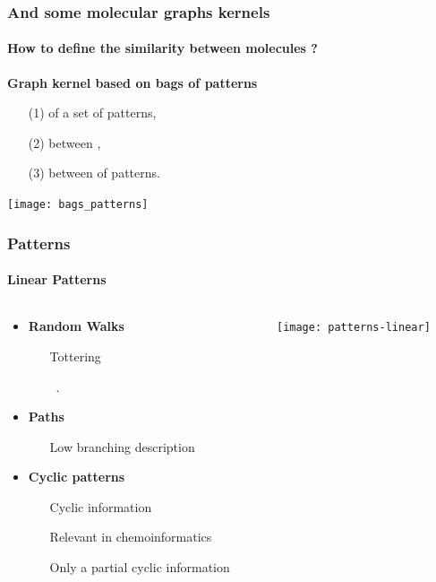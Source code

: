 \documentclass[11pt, pdf, compress, handout]{beamer}
\begin{document}
\begin{frame}
  \frametitle{And some molecular graphs kernels}
  \framesubtitle{How to define the similarity between molecules ? }
 \textbf{Graph kernel based on bags of patterns}
  \begin{itemize}
  \item[(1)]  of a set of patterns,
  \item[(2)]  between ,
  \item[(3)]  between  of patterns.
  \end{itemize}

  \begin{center}
    \texttt{[image: bags\_patterns]}
  \end{center}
\end{frame}

\begin{frame}
  \frametitle{Patterns}
  \framesubtitle{Linear Patterns}
  \begin{columns}
    \begin{column}{0.67\textwidth}
      \begin{itemize}
      \item \textbf{Random Walks \hspace{-0.3cm} \myinf \cite{RI-KASHIMA-2003}}
        \begin{itemize}
        \item[\itemmoins] Tottering
        \item[\itemplus]  ~\cite{RI-MAHE-2004}.
        \end{itemize}
        \vspace{.8cm}
      \item \textbf{Paths \hspace{-0.3cm} \myinfbar \cite{RI-RALAIVOLA-2005}}
        \begin{itemize}
        \item[\itemmoins] Low branching description
        \end{itemize}
        \vspace{.8cm}
      \item \textbf{Cyclic patterns \hspace{-0.3cm} \myinfbar \cite{CI-HORVATH-2004}}
        \begin{itemize}
        \item[\itemplus] Cyclic information
        \item[\itemplus] Relevant in chemoinformatics
        \item[\itemmoins] Only a partial cyclic information
        \end{itemize}
        
      \end{itemize}
      
    \end{column}
    \begin{column}{0.32\textwidth}
      \texttt{[image: patterns-linear]}
    \end{column}
  \end{columns}
  
\end{frame}
\end{document}
